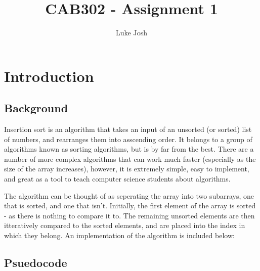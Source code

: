 \documentclass{article}
\title{CAB302 - Assignment 1}
\author{Luke Josh}
\begin{document}
\maketitle
\tableofcontents
\pagebreak

\section{Introduction}
\subsection{Background}
Insertion sort is an algorithm that takes an input of an unsorted (or sorted) list of numbers, and rearranges
them into asscending order. It belongs to a group of algorithms known as sorting algorithms, but is by far from the best.
There are a number of more complex algorithms that can work much faster (especially as the size of the array increases),
however, it is extremely simple, easy to implement, and great as a tool to teach computer science students about algorithms.

The algorithm can be thought of as seperating the array into two subarrays, one that is sorted, and one that isn't. Initially,
the first element of the array is sorted - as there is nothing to compare it to. The remaining unsorted elements are then itteratively compared
to the sorted elements, and are placed into the index in which they belong. An implementation of the algorithm is included below:\linebreak

\subsection{Psuedocode}
\begin{algorithmic}
    \Function{InsertionSort}{$A[0..n-1$}
            \EndWhile
        \EndFor
    \EndFunction
\end{algorithmic}
\end{document}
